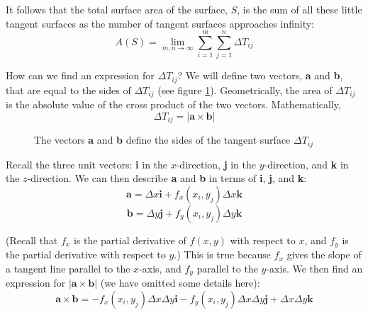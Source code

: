 It follows that the total surface area of the surface, $S$, is the sum of all 
these little tangent surfaces as the number of tangent surfaces approaches 
infinity:
$$A(S) = \lim_{m, n \to \infty} \sum_{i = 1}^m \sum_{j = 1}^n \Delta T_{ij}$$

How can we find an expression for $\Delta T_{ij}$? We will define two vectors, 
\textbf{a} and \textbf{b}, that are equal to the sides of $\Delta T_{ij}$ (see 
figure \ref{fig:vectors}). Geometrically, the area of $\Delta T_{ij}$ is the 
absolute value of the cross product of the two vectors. Mathematically, 
$$\Delta T_{ij} = |\textbf{a} \times \textbf{b}|$$

\begin{figure}[H]
    \centering
    \caption{The vectors \textbf{a} and \textbf{b} define the sides of the 
    tangent surface $\Delta T_{ij}$}
    \label{fig:vectors}
\end{figure}

Recall the three unit vectors: \textbf{i} in the $x$-direction, \textbf{j} in 
the $y$-direction, and \textbf{k} in the $z$-direction. We can then describe 
\textbf{a} and \textbf{b} in terms of \textbf{i}, \textbf{j}, and \textbf{k}:
$$\textbf{a} = \Delta x \textbf{i} + f_x(x_i, y_j) \Delta x \textbf{k}$$
$$\textbf{b} = \Delta y \textbf{j} + f_y(x_i, y_j) \Delta y \textbf{k}$$

(Recall that $f_x$ is the partial derivative of $f(x, y)$ with respect to $x$, 
and $f_y$ is the partial derivative with respect to $y$.) This is true because 
$f_x$ gives the slope of a tangent line parallel to 
the $x$-axis, and $f_y$ parallel to the $y$-axis. We then find an expression 
for $| \textbf{a} \times \textbf{b} |$ (we have omitted some details here):
$$\textbf{a} \times \textbf{b} = -f_x(x_i, y_j) \Delta x \Delta y \textbf{i} - 
f_y(x_i, y_j) \Delta x \Delta y \textbf{j} + \Delta x \Delta y \textbf{k}$$

